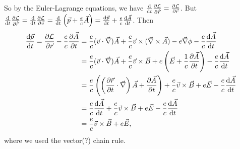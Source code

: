 \documentclass[11pt]{article}
\newcommand{\br}[1]{\left(#1\right)}
\begin{document}
\begin{enumerate}[label=(\alph*)]
    So by the Euler-Lagrange equations, we have $\dv{t}\pdv{\mathcal{L}}{\dot{\vec{r}}} = \pdv{\mathcal{L}}{\vec{r}}$. But $\dv{t}\pdv{\mathcal{L}}{\dot{\vec{r}}} = \dv{t}\pdv{\mathcal{L}}{\vec{v}} = \dv{t} \br{\vec{p} + \frac{e}{c}\vec{A}} = \dv{\vec{p}}{t} + \frac{e}{c}\dv{\vec{A}}{t}$. Then 
    \begin{align*}
        \dv{\vec{p}}{t} = \pdv{\mathcal{L}}{\vec{r}}- \frac{e}{c}\pdv{\vec{A}}{t} &= \frac{e}{c} (\vec{v}\cdot\vec{\nabla})\vec{A} + \frac{e}{c}\vec{v}\times (\vec{\nabla}\times \vec{A})  - e\vec{\nabla}\phi - \frac{e}{c}\dv{\vec{A}}{t}\\
        &= \frac{e}{c} (\vec{v}\cdot\vec{\nabla})\vec{A} + \frac{e}{c}\vec{v}\times \vec{B}  + e\br{\vec{E} + \frac{1}{c}\pdv{\vec{A}}{t}} - \frac{e}{c}\dv{\vec{A}}{t}\\
        &= \frac{e}{c}\br{\br{\pdv{\vec{r}}{t}\cdot\vec{\nabla}}\vec{A} + \pdv{\vec{A}}{t}} + \frac{e}{c}\vec{v}\times\vec{B}+ e\vec{E} - \frac{e}{c}\dv{\vec{A}}{t}\\
        &= \frac{e}{c}\dv{\vec{A}}{t} + \frac{e}{c}\vec{v}\times\vec{B}+ e\vec{E} - \frac{e}{c}\dv{\vec{A}}{t}\\
        &= \frac{e}{c}\vec{v}\times\vec{B} + e\vec{E},
    \end{align*} where we used the vector(?) chain rule.
\end{enumerate}
\end{document}

